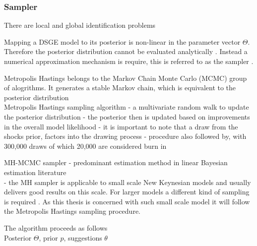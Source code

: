\documentclass[11pt,a4paper,english]{article} %
\begin{document}
	
	
	\subsubsection{Sampler}
	
	There are local and global identification problems \cite{herbst_bayesian_2014}
	
	Mapping a DSGE model to its posterior is non-linear in the parameter vector $\Theta$. Therefore the posterior distribution cannot be evaluated analytically \cite{herbst_bayesian_2014}. Instead a numerical approximation mechanism is require, this is referred to as the sampler \cite{guerron-quintana_bayesian_2013}.
	
	Metropolis Hastings belongs to the Markov Chain Monte Carlo (MCMC) group of alogrithms. 
	It generates a stable Markov chain, which is equivalent to the posterior distribution \cite{herbst_bayesian_2014}
	\\
	
	
	Metropolis Hastings sampling algorithm
	- a multivariate random walk to update the posterior distribution
	- the posterior then is updated based on improvements in the overall model likelihood
	- it is important to note that a draw from the shocks prior, factors into the drawing process
	- procedure also followed by, with 300,000 draws of which 20,000 are considered burn in \cite{chin_bayesian_2019}
	
	MH-MCMC sampler
	- predominant estimation method in linear Bayesian estimation literature \cite{guerron-quintana_bayesian_2013}\\
	- the MH sampler is applicable to small scale New Keynesian models and usually delivers good results on this scale. For larger models a different kind of sampling is required \cite{herbst_bayesian_2014}. As this thesis is concerned with such small scale model it will follow the Metropolis Hastings sampling procedure.
	
	
	The algorithm proceeds as follows \cite{herbst_bayesian_2014}\\
	
	Posterior $\Theta$, prior $p$, suggestions $\theta$
	
\end{document}
